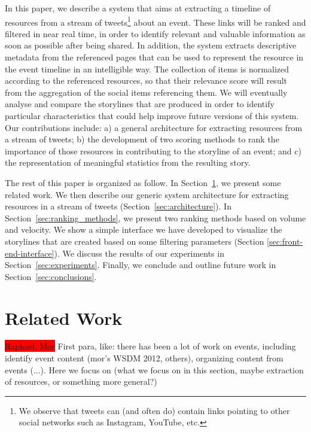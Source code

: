 \documentclass{sig-alternate}
\newcommand{\todo}[1]{\colorbox{red}{#1}}
\begin{document}
In this paper, we describe a system that aims at extracting a timeline of resources from a stream of tweets\footnote{We observe that tweets can (and often do) contain links pointing to other social networks such as Instagram, YouTube, etc.} about an event. These links will be ranked and filtered in near real time, in order to identify relevant and valuable information as soon as possible after being shared. In addition, the system extracts descriptive metadata from the referenced pages that can be used to represent the resource in the event timeline in an intelligible way. The collection of items is normalized according to the referenced resources, so that their relevance score will result from the aggregation of the social items referencing them. We will eventually analyse and compare the storylines that are produced in order to identify particular characteristics that could help improve future versions of this system. Our contributions include: a) a general architecture for extracting resources from a stream of tweets; b) the development of two scoring methods to rank the importance of those resources in contributing to the storyline of an event; and c) the representation of meaningful statistics from the resulting story.

The rest of this paper is organized as follow. In Section~\ref{sec:related-work}, we present some related work. We then describe our generic system architecture for extracting resources in a stream of tweets (Section~\ref{sec:architecture}). In Section~\ref{sec:ranking_methods}, we present two ranking methods based on volume and velocity. We show a simple interface we have developed to visualize the storylines that are created based on some filtering parameters (Section \ref{sec:front-end-interface}). We discuss the results of our experiments in Section~\ref{sec:experiments}. Finally, we conclude and outline future work in Section~\ref{sec:conclusions}.


\section{Related Work}
\label{sec:related-work}

\todo{Raphael, Mor}
First para, like: there has been a lot of work on events, including identify event content (mor's WSDM 2012, others), organizing content from events (...). Here we focus on (what we focus on in this section, maybe extraction of resources, or something more general?)
\end{document}
